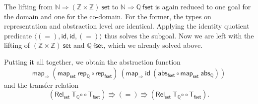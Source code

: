 \documentclass{article}
\theoremstyle{definition}
\newcommand{\relcomp}{\mathbin{\circ\circ}}
\newcommand{\id}{\mathsf{id}}
\newcommand{\mapfun}{\mathsf{map_\Rightarrow}}
\newcommand{\nat}{\mathbb{N}}
\newcommand{\inte}{\mathbb{Z}}
\newcommand{\rat}{\mathbb{Q}}
\newcommand{\abs}{\mathsf{abs}}
\newcommand{\rep}{\mathsf{rep}}
\begin{document}
The lifting from \(\nat \Rightarrow (\inte \times \inte)\ \mathsf{set}\) to \(\nat \Rightarrow \rat\ \mathsf{fset}\) is again reduced to one goal for the domain and one for the co-domain.
For the former, the types on representation and abstraction level are identical.
Applying the identity quotient predicate \(\langle (=), \id, \id, (=) \rangle\) thus solves the subgoal.
Now we are left with the lifting of \((\inte \times \inte)\ \mathsf{set}\) and \(\rat\ \mathsf{fset}\), which we already solved above.

Putting it all together, we obtain the abstraction function
\begin{equation*}
	\mapfun\ (\mathsf{map_{set}}\ \rep_\rat \circ \rep_\mathsf{fset})\ (\mapfun\ \id\ (\abs_\mathsf{fset} \circ \mathsf{map_{set}}\ \abs_\rat))
\end{equation*}
and the transfer relation
\begin{equation*}
	(\mathsf{Rel_{set}}\ \mathsf{T_\rat} \relcomp \mathsf{T_{fset}}) \Rrightarrow (=) \Rrightarrow (\mathsf{Rel_{set}}\ \mathsf{T_\rat} \relcomp \mathsf{T_{fset}}).
\end{equation*}
\end{document}
